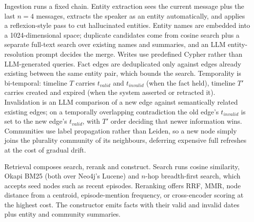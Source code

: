 Ingestion runs a fixed chain. Entity extraction sees the current message plus the last $n=4$ messages, extracts the speaker as an entity automatically, and applies a reflexion-style pass to cut hallucinated entities. Entity names are embedded into a 1024-dimensional space; duplicate candidates come from cosine search plus a separate full-text search over existing names and summaries, and an LLM entity-resolution prompt decides the merge. Writes use predefined Cypher rather than LLM-generated queries. Fact edges are deduplicated only against edges already existing between the same entity pair, which bounds the search. Temporality is bi-temporal: timeline $T$ carries $t_{valid}$ and $t_{invalid}$ (when the fact held), timeline $T'$ carries created and expired (when the system asserted or retracted it). Invalidation is an LLM comparison of a new edge against semantically related existing edges; on a temporally overlapping contradiction the old edge's $t_{invalid}$ is set to the new edge's $t_{valid}$, with $T'$ order deciding that newer information wins. Communities use label propagation rather than Leiden, so a new node simply joins the plurality community of its neighbours, deferring expensive full refreshes at the cost of gradual drift.

Retrieval composes search, rerank and construct. Search runs cosine similarity, Okapi BM25 (both over Neo4j's Lucene) and $n$-hop breadth-first search, which accepts seed nodes such as recent episodes. Reranking offers RRF, MMR, node distance from a centroid, episode-mention frequency, or cross-encoder scoring at the highest cost. The constructor emits facts with their valid and invalid dates plus entity and community summaries.

\begin{center}
\end{center}

